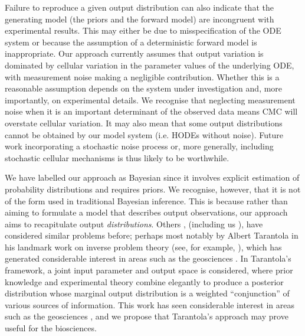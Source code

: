 Failure to reproduce a given output distribution can also indicate that the generating model (the priors and the forward model) are incongruent with experimental results. This may either be due to misspecification of the ODE system or because the assumption of a deterministic forward model is inappropriate. Our approach currently assumes that output variation is dominated by cellular variation in the parameter values of the underlying ODE, with measurement noise making a negligible contribution. Whether this is a reasonable assumption depends on the system under investigation and, more importantly, on experimental details. We recognise that neglecting measurement noise when it is an important determinant of the observed data means CMC will overstate cellular variation. It may also mean that some output distributions cannot be obtained by our model system (i.e. HODEs without noise). Future work incorporating a stochastic noise process or, more generally, including stochastic cellular mechanisms is thus likely to be worthwhile.

We have labelled our approach as Bayesian since it involves explicit estimation of probability distributions and requires priors. We recognise, however, that it is not of the form used in traditional Bayesian inference. This is because rather than aiming to formulate a model that describes output observations, our approach aims to recapitulate output \emph{distributions}. Others \cite{BJW-18}, (including us \cite{lambert2018inverse}), have considered similar problems before; perhaps most notably by Albert Tarantola in his landmark work on inverse problem theory (see, for example, \cite{tarantola2005inverse}), which has generated considerable interest in areas such as the geosciences \cite{mosegaard1995monte,vukicevic2008analysis}. In Tarantola's framework, a joint input parameter and output space is considered, where prior knowledge and experimental theory combine elegantly to produce a posterior distribution whose marginal output distribution is a weighted ``conjunction'' of various sources of information. This work has seen considerable interest in areas such as the geosciences \cite{mosegaard1995monte,vukicevic2008analysis}, and we propose that Tarantola's approach may prove useful for the biosciences.


